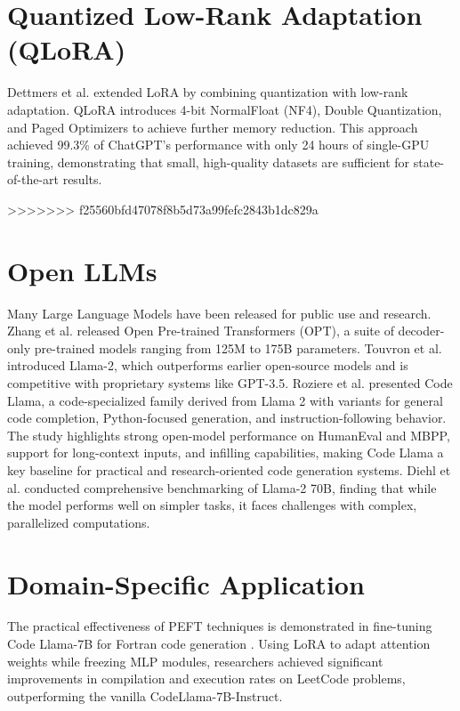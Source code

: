 \section{Quantized Low-Rank Adaptation (QLoRA)}
Dettmers et al. \cite{Dettmers2023} extended LoRA by combining quantization with low-rank adaptation. QLoRA introduces 4-bit NormalFloat (NF4), Double Quantization, and Paged Optimizers to achieve further memory reduction. This approach achieved 99.3\% of ChatGPT's performance with only 24 hours of single-GPU training, demonstrating that small, high-quality datasets are sufficient for state-of-the-art results.

>>>>>>> f25560bfd47078f8b5d73a99fefc2843b1dc829a
\section{Open LLMs}
Many Large Language Models have been released for public use and research. Zhang et al. \cite{Zhang2022} released Open Pre-trained Transformers (OPT), a suite of decoder-only pre-trained models ranging from 125M to 175B parameters. Touvron et al. \cite{Touvron2023Llama2} introduced Llama-2, which outperforms earlier open-source models and is competitive with proprietary systems like GPT-3.5. Roziere et al. \cite{Roziere2023CodeLlama} presented Code Llama, a code-specialized family derived from Llama 2 with variants for general code completion, Python-focused generation, and instruction-following behavior. The study highlights strong open-model performance on HumanEval and MBPP, support for long-context inputs, and infilling capabilities, making Code Llama a key baseline for practical and research-oriented code generation systems. Diehl et al. \cite{Diehl2024Llama2Benchmark} conducted comprehensive benchmarking of Llama-2 70B, finding that while the model performs well on simpler tasks, it faces challenges with complex, parallelized computations.

\section{Domain-Specific Application}
The practical effectiveness of PEFT techniques is demonstrated in fine-tuning Code Llama-7B for Fortran code generation \cite{Govande2024}. Using LoRA to adapt attention weights while freezing MLP modules, researchers achieved significant improvements in compilation and execution rates on LeetCode problems, outperforming the vanilla CodeLlama-7B-Instruct.

